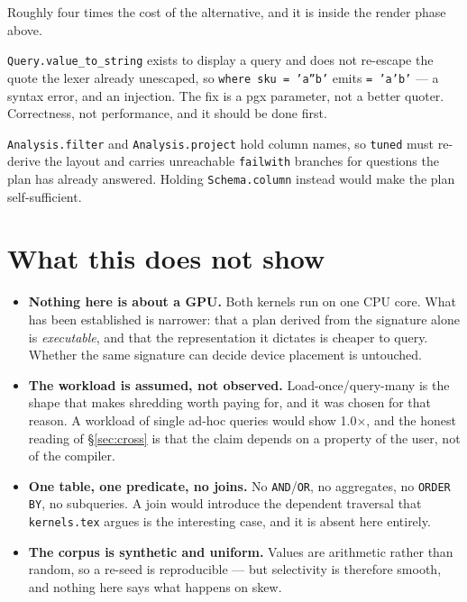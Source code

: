 \documentclass[11pt,a4paper]{article}
\newcommand{\squeeze}[1]{\textcolor{open}{\textbf{#1}}}
\begin{document}
\begin{description}[leftmargin=0pt, style=nextline]
\item[\squeeze{\texttt{Data.cell} formats floats with \texttt{Printf.sprintf "\%.2f"}.}]
Roughly four times the cost of the alternative, and it is inside the render phase above.

\item[\squeeze{Literals are pasted into the SQL text.}]
\texttt{Query.value\_to\_string} exists to display a query and does not re-escape the
quote the lexer already unescaped, so \texttt{where sku = 'a''b'} emits \texttt{= 'a'b'}
--- a syntax error, and an injection. The fix is a pgx parameter, not a better quoter.
Correctness, not performance, and it should be done first.

\item[\squeeze{The plan carries names, not layouts.}]
\texttt{Analysis.filter} and \texttt{Analysis.project} hold column names, so
\texttt{tuned} must re-derive the layout and carries unreachable \texttt{failwith}
branches for questions the plan has already answered. Holding \texttt{Schema.column}
instead would make the plan self-sufficient.

\end{description}

\section{What this does not show}

\begin{itemize}[leftmargin=1.4em]
\item \textbf{Nothing here is about a GPU.} Both kernels run on one CPU core. What has
  been established is narrower: that a plan derived from the signature alone is
  \emph{executable}, and that the representation it dictates is cheaper to query. Whether
  the same signature can decide device placement is untouched.
\item \textbf{The workload is assumed, not observed.} Load-once/query-many is the shape
  that makes shredding worth paying for, and it was chosen for that reason. A workload of
  single ad-hoc queries would show 1.0$\times$, and the honest reading of
  \S\ref{sec:cross} is that the claim depends on a property of the user, not of the
  compiler.
\item \textbf{One table, one predicate, no joins.} No \texttt{AND}/\texttt{OR}, no
  aggregates, no \texttt{ORDER BY}, no subqueries. A join would introduce the dependent
  traversal that \texttt{kernels.tex} argues is the interesting case, and it is absent
  here entirely.
\item \textbf{The corpus is synthetic and uniform.} Values are arithmetic rather than
  random, so a re-seed is reproducible --- but selectivity is therefore smooth, and
  nothing here says what happens on skew.
\end{itemize}
\end{document}

